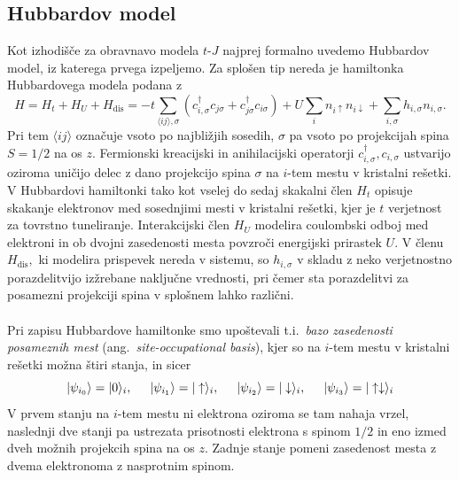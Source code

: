 \subsection{Hubbardov model}
Kot izhodišče za obravnavo modela $t$-$J$ najprej formalno uvedemo Hubbardov model, iz katerega prvega izpeljemo. Za splošen tip nereda je hamiltonka Hubbardovega modela podana z 
\begin{equation}\label{eq:hubbard_main_text}
H=H_t + H_U+ H_\mathrm{dis}=-t\sum\limits_{\langle ij \rangle, \sigma}\left(c^\dagger_{i,\sigma} c_{j\sigma} + c^\dagger_{j\sigma}c_{i\sigma}\right) + U\sum_i n_{i\uparrow}n_{i\downarrow} +  \sum\limits_{i,\sigma} h_{i,\sigma} n_{i, \sigma}. 
\end{equation}
Pri tem  $\langle ij \rangle$ označuje vsoto po najbližjih sosedih, $\sigma$ pa vsoto po projekcijah spina $S=1/2$ na os $z$. Fermionski kreacijski in anihilacijski operatorji $c^\dagger_{i,\sigma}, c_{i,\sigma}$ ustvarijo oziroma uničijo delec z dano projekcijo spina $\sigma$ na $i$-tem mestu v kristalni rešetki.  V Hubbardovi hamiltonki tako kot vselej do sedaj skakalni člen $H_t$ opisuje skakanje elektronov med sosednjimi mesti v kristalni rešetki, kjer je $t$ verjetnost za tovrstno tuneliranje. Interakcijski člen $H_U$ modelira coulombski odboj med elektroni in ob dvojni zasedenosti mesta povzroči energijski prirastek $U.$ V členu $H_\mathrm{dis},$ ki modelira prispevek nereda v sistemu, so  $h_{i,\sigma}$ v skladu z neko verjetnostno porazdelitvijo izžrebane naključne vrednosti, pri čemer sta porazdelitvi za posamezni projekciji spina v splošnem lahko različni. \\\\
Pri zapisu Hubbardove hamiltonke smo upoštevali t.i.~\emph{bazo zasedenosti posameznih mest} (ang.~\emph{site-occupational basis}), kjer so na $i$-tem mestu v kristalni rešetki možna štiri stanja, in sicer 
\begin{equation}\label{eq:hubstates}
\vert\psi_{i_0}\rangle=\vert0\rangle_i, \hspace{5mm} \vert\psi_{i_1}\rangle=\vert\uparrow\rangle_i,\hspace{5mm} \vert\psi_{i_{2}}\rangle=\vert\downarrow\rangle_i, \hspace{5mm} \vert\psi_{i_{3}}\rangle=\vert\uparrow\downarrow\rangle_i
\end{equation}
V prvem stanju na $i$-tem mestu ni elektrona oziroma se tam nahaja vrzel, naslednji dve stanji pa ustrezata prisotnosti elektrona s spinom $1/2$ in eno izmed dveh možnih projekcih spina na os $z$. Zadnje stanje pomeni zasedenost mesta z dvema elektronoma z nasprotnim spinom. \\\\
